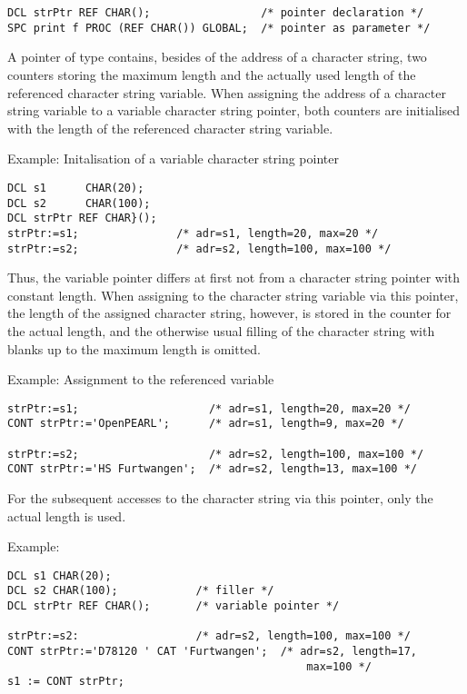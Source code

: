 \begin{lstlisting}
DCL strPtr REF CHAR();                 /* pointer declaration */ 
SPC print f PROC (REF CHAR()) GLOBAL;  /* pointer as parameter */
\end{lstlisting}

A pointer of type  contains, besides of the address of a
character string, two counters storing the maximum length and the
actually used length of the referenced character string variable. When
assigning the address of a character string variable to a variable
character string pointer, both counters are initialised with the length
of the referenced character string variable.

Example: Initalisation of a variable character string pointer

\begin{lstlisting}
DCL s1      CHAR(20);
DCL s2      CHAR(100);
DCL strPtr REF CHAR}();
strPtr:=s1;               /* adr=s1, length=20, max=20 */ 
strPtr:=s2;               /* adr=s2, length=100, max=100 */
\end{lstlisting}

Thus, the variable pointer differs at first not from a character string
pointer with constant length. When assigning to the character string
variable via this pointer, the length of the assigned character string,
however, is stored in the counter for the actual length, and the
otherwise usual filling of the character string with blanks up to the
maximum length is omitted.

Example: Assignment to the referenced variable

\begin{lstlisting}
strPtr:=s1;                    /* adr=s1, length=20, max=20 */ 
CONT strPtr:='OpenPEARL';      /* adr=s1, length=9, max=20 */ 
 
strPtr:=s2;                    /* adr=s2, length=100, max=100 */
CONT strPtr:='HS Furtwangen';  /* adr=s2, length=13, max=100 */
\end{lstlisting}

For the subsequent accesses to the character string via this pointer,
only the actual length is used.

Example:

\begin{lstlisting}
DCL s1 CHAR(20);
DCL s2 CHAR(100);            /* filler */ 
DCL strPtr REF CHAR();       /* variable pointer */ 

strPtr:=s2:                  /* adr=s2, length=100, max=100 */ 
CONT strPtr:='D78120 ' CAT 'Furtwangen';  /* adr=s2, length=17,
                                              max=100 */
s1 := CONT strPtr;
\end{lstlisting}

